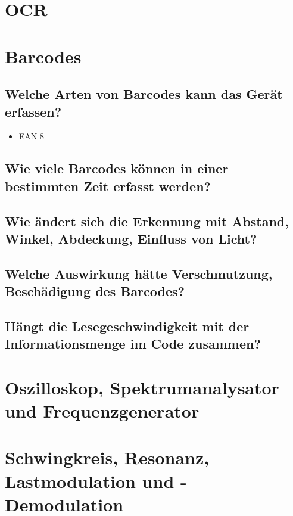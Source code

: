 \documentclass[a4paper,12pt,headsepline,footsepline]{scrartcl}
\begin{document}
\section{OCR}

\section{Barcodes}

\subsection{Welche Arten von Barcodes kann das Gerät erfassen?}

\begin{itemize}
  \item EAN 8
\end{itemize}

\subsection{Wie viele Barcodes können in einer bestimmten Zeit erfasst werden?}

\subsection{Wie ändert sich die Erkennung mit Abstand, Winkel, Abdeckung, Einfluss von Licht?}

\subsection{Welche Auswirkung hätte Verschmutzung, Beschädigung des Barcodes?}

\subsection{Hängt die Lesegeschwindigkeit mit der Informationsmenge im Code zusammen?}

\section{Oszilloskop, Spektrumanalysator und Frequenzgenerator}

\section{Schwingkreis, Resonanz, Lastmodulation und -Demodulation}
\end{document}
